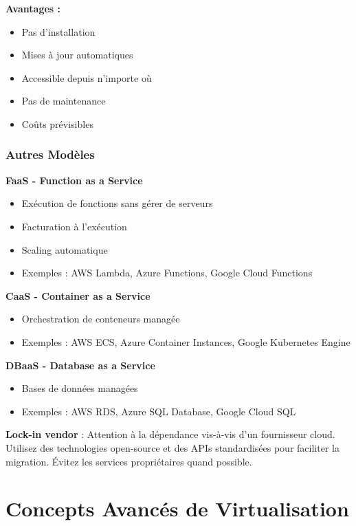 \documentclass[11pt,a4paper]{article}
\begin{document}
\textbf{Avantages :}
\begin{itemize}
    \item Pas d'installation
    \item Mises à jour automatiques
    \item Accessible depuis n'importe où
    \item Pas de maintenance
    \item Coûts prévisibles
\end{itemize}

\subsubsection{Autres Modèles}

\textbf{FaaS - Function as a Service}
\begin{itemize}
    \item Exécution de fonctions sans gérer de serveurs
    \item Facturation à l'exécution
    \item Scaling automatique
    \item Exemples : AWS Lambda, Azure Functions, Google Cloud Functions
\end{itemize}

\textbf{CaaS - Container as a Service}
\begin{itemize}
    \item Orchestration de conteneurs managée
    \item Exemples : AWS ECS, Azure Container Instances, Google Kubernetes Engine
\end{itemize}

\textbf{DBaaS - Database as a Service}
\begin{itemize}
    \item Bases de données managées
    \item Exemples : AWS RDS, Azure SQL Database, Google Cloud SQL
\end{itemize}

\begin{dangerbox}
\textbf{Lock-in vendor} : Attention à la dépendance vis-à-vis d'un fournisseur cloud. Utilisez des technologies open-source et des APIs standardisées pour faciliter la migration. Évitez les services propriétaires quand possible.
\end{dangerbox}

\section{Concepts Avancés de Virtualisation}
\end{document}
